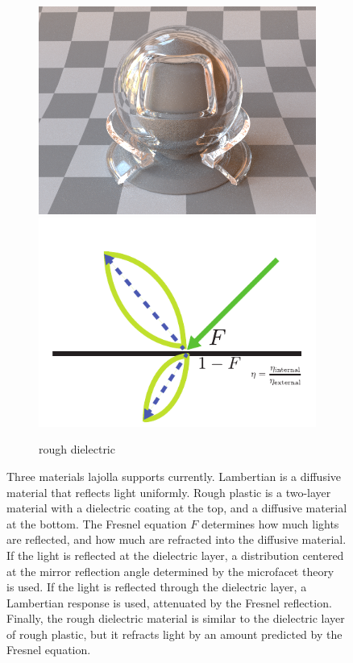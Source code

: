 \begin{figure}
\begin{subfigure}[t]{0.32\linewidth}
\begin{minipage}[t]{\linewidth}
            \includegraphics[width=\linewidth]{imgs/roughdielectric_render.png}
            \includegraphics[width=\linewidth]{imgs/roughdielectric.pdf}
        \end{minipage}
        \caption{rough dielectric}
        \label{fig:rough_dielectric}
    \end{subfigure}
    \caption{Three materials lajolla supports currently. Lambertian is a diffusive material that reflects light uniformly. Rough plastic is a two-layer material with a dielectric coating at the top, and a diffusive material at the bottom. The Fresnel equation $F$ determines how much lights are reflected, and how much are refracted into the diffusive material. If the light is reflected at the dielectric layer, a distribution centered at the mirror reflection angle determined by the microfacet theory~\cite{Cook:1982:RMC} is used. If the light is reflected through the dielectric layer, a Lambertian response is used, attenuated by the Fresnel reflection. Finally, the rough dielectric material is similar to the dielectric layer of rough plastic, but it refracts light by an amount predicted by the Fresnel equation.}
    \label{fig:materials}
\end{figure}

